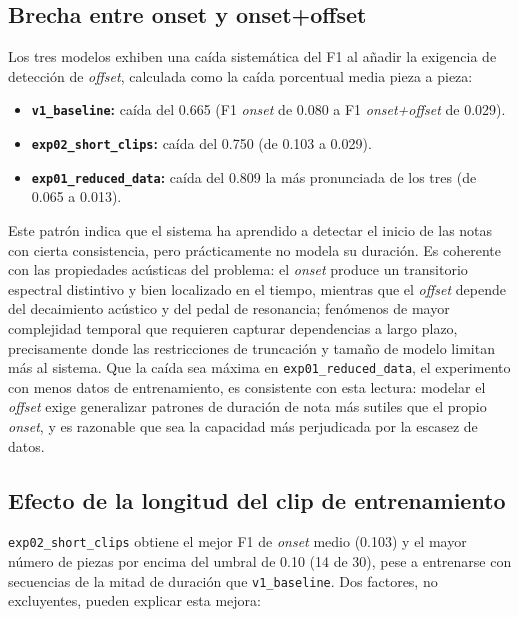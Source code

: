 \subsection{Brecha entre onset y onset+offset}

Los tres modelos exhiben una caída sistemática del F1 al añadir la
exigencia de detección de \textit{offset}, calculada como la caída
porcentual media pieza a pieza:

\begin{itemize}
    \item \textbf{\texttt{v1\_baseline}:} caída del 0.665
    (F1 \textit{onset} de 0.080 a F1 \textit{onset+offset} de 0.029).
    \item \textbf{\texttt{exp02\_short\_clips}:} caída del 0.750
    (de 0.103 a 0.029).
    \item \textbf{\texttt{exp01\_reduced\_data}:} caída del 0.809
    la más pronunciada de los tres (de 0.065 a 0.013).
\end{itemize}

Este patrón indica que el sistema ha aprendido a detectar el inicio de
las notas con cierta consistencia, pero prácticamente no modela su
duración. Es coherente con las propiedades acústicas del problema: el
\textit{onset} produce un transitorio espectral distintivo y bien
localizado en el tiempo, mientras que el \textit{offset} depende del
decaimiento acústico y del pedal de resonancia; fenómenos de mayor
complejidad temporal que requieren capturar dependencias a largo
plazo, precisamente donde las restricciones de truncación y tamaño de
modelo limitan más al sistema. Que la caída sea máxima en
\texttt{exp01\_reduced\_data}, el experimento con menos datos de
entrenamiento, es consistente con esta lectura: modelar el
\textit{offset} exige generalizar patrones de duración de nota más
sutiles que el propio \textit{onset}, y es razonable que sea la
capacidad más perjudicada por la escasez de datos.

\subsection{Efecto de la longitud del clip de entrenamiento}

\texttt{exp02\_short\_clips} obtiene el mejor F1 de \textit{onset}
medio (0.103) y el mayor número de piezas por encima del umbral de
0.10 (14 de 30), pese a entrenarse con secuencias de la mitad de
duración que \texttt{v1\_baseline}. Dos factores, no excluyentes,
pueden explicar esta mejora:

